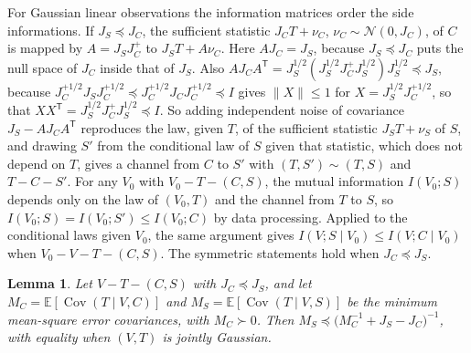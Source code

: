 \documentclass[11pt,onecolumn]{IEEEtran}
\newtheorem{lemma}[theorem]{Lemma}
\newcommand{\E}{\mathbb{E}}
\newcommand{\Cov}{\operatorname{Cov}}
\begin{document}
For Gaussian linear observations the information matrices order the
side informations. If $J_S\preceq J_C$, the sufficient statistic
$J_CT+\nu_C$, $\nu_C\sim\mathcal N(0,J_C)$, of $C$ is mapped by $A=J_SJ_C^{+}$ to
$J_ST+A\nu_C$. Here $AJ_C=J_S$, because $J_S\preceq J_C$ puts the null space
of $J_C$ inside that of $J_S$. Also
$AJ_CA^{\mathsf T}=J_S^{1/2}(J_S^{1/2}J_C^{+}J_S^{1/2})J_S^{1/2}\preceq J_S$,
because $J_C^{+1/2}J_SJ_C^{+1/2}\preceq J_C^{+1/2}J_CJ_C^{+1/2}\preceq I$
gives $\|X\|\le1$ for $X=J_S^{1/2}J_C^{+1/2}$, so that
$XX^{\mathsf T}=J_S^{1/2}J_C^{+}J_S^{1/2}\preceq I$. So adding independent noise of
covariance $J_S-AJ_CA^{\mathsf T}$ reproduces the law, given $T$, of the
sufficient statistic $J_ST+\nu_S$ of $S$, and drawing $S'$ from the
conditional law of $S$ given that statistic, which does not depend on
$T$, gives a channel from $C$ to $S'$ with $(T,S')\sim(T,S)$ and
$T-C-S'$. For any $V_0$ with $V_0-T-(C,S)$, the mutual information
$I(V_0;S)$ depends only on the law of $(V_0,T)$ and the channel from $T$
to $S$, so $I(V_0;S)=I(V_0;S')\le I(V_0;C)$ by data processing. Applied to
the conditional laws given $V_0$, the same argument gives
$I(V;S\mid V_0)\le I(V;C\mid V_0)$ when $V_0-V-T-(C,S)$. The symmetric
statements hold when $J_C\preceq J_S$.

\begin{lemma}\label{lem:mmsecomp}
Let $V-T-(C,S)$ with $J_C\preceq J_S$, and let
$M_C=\E[\Cov(T\mid V,C)]$ and $M_S=\E[\Cov(T\mid V,S)]$ be the minimum
mean-square error covariances, with $M_C\succ0$. Then
$M_S\preceq\bigl(M_C^{-1}+J_S-J_C\bigr)^{-1}$, with equality when $(V,T)$ is
jointly Gaussian.
\end{lemma}
\end{document}
